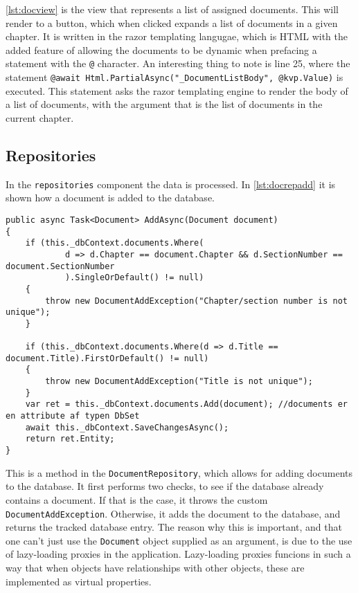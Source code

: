 \cref{lst:docview} is the view that represents a list of assigned documents.
This will render to a button, which when clicked expands a list of documents in a given chapter.
It is written in the razor templating langugae, which is HTML with the added feature of allowing the documents to be dynamic when prefacing a statement with the \texttt{@} character.
An interesting thing to note is line 25, where the statement \texttt{@await Html.PartialAsync("_DocumentListBody", @kvp.Value)} is executed.
This statement asks the razor templating engine to render the body of a list of documents, with the argument that is the list of documents in the current chapter.

\subsection{Repositories}

In the \texttt{repositories} component the data is processed.
In \cref{lst:docrepadd} it is shown how a document is added to the database.

\begin{lstlisting}[caption={Document repository: AddAsync}, label={lst:docrepadd}]
public async Task<Document> AddAsync(Document document)
{
	if (this._dbContext.documents.Where(
			d => d.Chapter == document.Chapter && d.SectionNumber == document.SectionNumber
			).SingleOrDefault() != null)
	{
		throw new DocumentAddException("Chapter/section number is not unique");
	}

	if (this._dbContext.documents.Where(d => d.Title == document.Title).FirstOrDefault() != null)
	{
		throw new DocumentAddException("Title is not unique");
	}
	var ret = this._dbContext.documents.Add(document); //documents er en attribute af typen DbSet
	await this._dbContext.SaveChangesAsync();
	return ret.Entity;
}
\end{lstlisting}


This is a method in the \texttt{DocumentRepository}, which allows for adding documents to the database.
It first performs two checks, to see if the database already contains a document.
If that is the case, it throws the custom \texttt{DocumentAddException}.
Otherwise, it adds the document to the database, and returns the tracked database entry.
The reason why this is important, and that one can't just use the \texttt{Document} object supplied as an argument, is due to the use of lazy-loading proxies in the application.
Lazy-loading proxies funcions in such a way that when objects have relationships with other objects, these are implemented as virtual properties.

